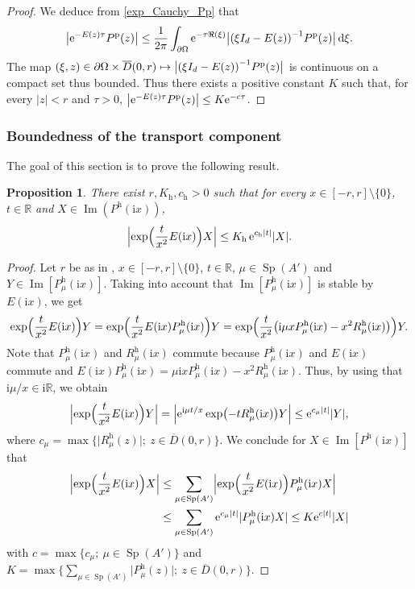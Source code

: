 \documentclass[10pt]{amsart}
\def\mto{\mathchoice{\longmapsto}{\mapsto}{\mapsto}{\mapsto}}
\theoremstyle{plain}
\newtheorem{prop}[theorem]{Proposition}
\theoremstyle{definition}
\theoremstyle{remark}
\DeclareMathOperator{\Sp}{Sp}
\DeclareMathOperator{\Ima}{Im}
\newcommand{\diff}[1][-3]{\ensuremath{\mathop{}\mkern#1mu\mathrm{d}}}
\newcommand{\set}{\mathbb}
\newcommand{\R}{} %
\renewcommand{\R}{\set{R}}
\newcommand{\h}{{\mathrm h}}
\newcommand{\p}{{\mathrm p}}
\newcommand{\eu}{\mathrm e}
\newcommand{\iu}{\mathrm i}
\let\originalleft\left
\let\originalright\right
\renewcommand{\left}{\mathopen{}\mathclose\bgroup\originalleft}
\renewcommand{\right}{\aftergroup\egroup\originalright}
\begin{document}
\begin{proof}
We deduce from \eqref{exp_Cauchy_Pp} that
\[
\bigl| \eu^{-E(z)\tau} P^\p(z) \bigr|
\leq \frac{1}{2\pi }\int_{\partial\Omega} \eu^{-\tau \Re(\xi)} \bigl| \left(\xi I_d - E(z) \right)^{-1} P^\p(z) \bigr| \diff\xi.
\]
The map $(\xi,z)\in\partial\Omega \times \overline{D}(0,r) \mto \bigl| \left(\xi I_d - E(z) \right)^{-1} P^\p(z) \bigr|$ is continuous on a compact set thus bounded. Thus there exists a positive constant $K$ such that, for every $|z|<r$ and $\tau>0$,
$\left| \eu^{-E(z)\tau} P^\p(z) \right| \leq K \eu^{-c\tau}$.
\end{proof}

\subsubsection{Boundedness of the transport component}\label{subsubsec:bound}

The goal of this section is to prove the following result.

\begin{prop} \label{Prop:dissip_h}
There exist $r, K_\h, c_\h >0$ such that for every $x\in [-r,r]\setminus\{0\}$, $t\in\R$ and $X \in \Ima(P^\h(\iu x))$,
\[
\Bigl\lvert \exp\Bigl(\frac{t}{x^2} E(\iu x) \Bigr) X \Bigr\rvert \leq K_\h \,\eu^{c_\h |t|} |X|.
\]
\end{prop}

\begin{proof}
Let $r$ be as in , $x \in [-r,r]\setminus\{0\}$, $t\in\R$, $\mu \in \Sp(A')$ and $Y \in \Ima[P^\h_\mu(\iu x)]$.
Taking into account that $\Ima[P^\h_\mu(\iu x)]$ is stable by $E(\iu x)$, we get
\[
\exp \Bigl(\frac{t}{x^2} E(\iu x) \Bigr) Y
=\exp \Bigl(\frac{t}{x^2} E(\iu x) P_\mu^\h(\iu x) \Bigr) Y \\
=\exp \Bigl(\frac{t}{x^2} \bigl(\iu\mu x P_\mu^\h(\iu x)- x^2 R_\mu^\h(\iu x) \bigr) \Bigr) Y.
\]
Note that $P_\mu^\h(\iu x)$ and $R_\mu^\h(\iu x)$ commute
because $P_\mu^\h(\iu x)$ and $E(\iu x)$ commute and
$E(\iu x)P_\mu^\h(\iu x)=\mu \iu x P_\mu^\h(\iu x)-x^2 R_\mu^\h(\iu x)$. Thus, by using that $\iu \mu/ x \in \iu\R$, we obtain
\[
\Bigl\lvert \exp \Bigl(\frac{t}{x^2} E(\iu x) \Bigr) Y \Bigr\rvert =
\Bigl\lvert\eu^{\iu\mu t/x} \exp\left(-tR_\mu^\h(\iu x) \right) Y\Bigr\rvert
\leq \eu^{c_\mu |t|} | Y |,
\]
where $c_\mu=\max\{ \lvert R_\mu^\h(z)\rvert ;\: z \in \overline{D}(0,r) \}$.
We conclude for $X\in\Ima[P^\h(\iu x)]$ that
\begin{align*}
\Bigl\lvert \exp \Bigl(\frac{t}{x^2} E(\iu x) \Bigr) X \Bigr\rvert
& \leq
\sum_{\mu \in \Sp(A')} \Bigl\lvert \exp \Bigl(\frac{t}{x^2} E(\iu x) \Bigr) P^\h_\mu(\iu x) X \Bigr\rvert
\\ & \leq
\sum_{\mu \in \Sp(A')} \eu^{c_\mu |t|} \lvert P^\h_\mu(\iu x) X \rvert
\leq
K \eu^{c|t|} |X|
\end{align*}
with
$c=\max\{ c_\mu ;\: \mu \in \Sp(A') \}$ and
$K=\max\bigl\{ \sum_{\mu \in \Sp(A')} \lvert P^\h_\mu(z) \rvert;\: z \in \overline{D}(0,r) \bigr\}$.
\end{proof}
\end{document}

